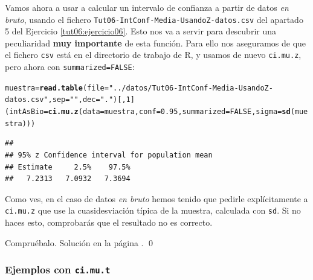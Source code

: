 \documentclass[10pt,a4paper]{article}\usepackage[]{graphicx}\usepackage[]{color}
\makeatletter
\newcommand{\hlnum}[1]{\textcolor[rgb]{0.686,0.059,0.569}{#1}}%
\newcommand{\hlstr}[1]{\textcolor[rgb]{0.192,0.494,0.8}{#1}}%
\newcommand{\hlstd}[1]{\textcolor[rgb]{0.345,0.345,0.345}{#1}}%
\newcommand{\hlkwb}[1]{\textcolor[rgb]{0.69,0.353,0.396}{#1}}%
\newcommand{\hlkwc}[1]{\textcolor[rgb]{0.333,0.667,0.333}{#1}}%
\newcommand{\hlkwd}[1]{\textcolor[rgb]{0.737,0.353,0.396}{\textbf{#1}}}%
\newenvironment{kframe}{%
 \def\at@end@of@kframe{}%
 \ifinner\ifhmode%
  \def\at@end@of@kframe{\end{minipage}}%
  \begin{minipage}{\columnwidth}%
 \fi\fi%
 \def\FrameCommand##1{\hskip\@totalleftmargin \hskip-\fboxsep
 \colorbox{shadecolor}{##1}\hskip-\fboxsep
     \hskip-\linewidth \hskip-\@totalleftmargin \hskip\columnwidth}%
 \MakeFramed {\advance\hsize-\width
   \@totalleftmargin\z@ \linewidth\hsize
   \@setminipage}}%
 {\par\unskip\endMakeFramed%
 \at@end@of@kframe}
\newenvironment{knitrout}{}{} %
\makeatother
\begin{document}
Vamos ahora a usar a calcular un intervalo de confianza a partir de datos {\em en bruto}, usando el fichero {\tt Tut06-IntConf-Media-UsandoZ-datos.csv} del apartado 5 del Ejercicio \ref{tut06:ejercicio06}. Esto nos va a servir para descubrir una peculiaridad {\bf muy importante} de esta función. Para ello nos aseguramos de que el fichero {\tt csv} está en el directorio de trabajo de R, y usamos de nuevo {\tt ci.mu.z}, pero ahora con {\tt summarized=FALSE}:
\begin{knitrout}
\color{fgcolor}\begin{kframe}
\begin{alltt}
\hlstd{muestra} \hlkwb{=} \hlkwd{read.table}\hlstd{(}\hlkwc{file}\hlstd{=}\hlstr{"../datos/Tut06-IntConf-Media-UsandoZ-datos.csv"}\hlstd{,} \hlkwc{sep}\hlstd{=}\hlstr{" "}\hlstd{,} \hlkwc{dec}\hlstd{=}\hlstr{"."}\hlstd{)[ ,}\hlnum{1}\hlstd{]}
\hlstd{(intAsBio} \hlkwb{=} \hlkwd{ci.mu.z}\hlstd{(}\hlkwc{data}\hlstd{=muestra,} \hlkwc{conf}\hlstd{=}\hlnum{0.95}\hlstd{,} \hlkwc{summarized}\hlstd{=}\hlnum{FALSE}\hlstd{,} \hlkwc{sigma} \hlstd{=} \hlkwd{sd}\hlstd{(muestra)))}
\end{alltt}
\begin{verbatim}
## 
## 95% z Confidence interval for population mean 
## Estimate     2.5%    97.5% 
##   7.2313   7.0932   7.3694
\end{verbatim}
\end{kframe}
\end{knitrout}
Como ves, en el caso de datos {\em en bruto} hemos tenido que pedirle explícitamente a {\tt ci.mu.z} que use la cuasidesviación típica de la muestra, calculada con {\tt sd}. Si no haces esto, comprobarás que el resultado no es correcto.
\begin{ejercicio}
\label{tut06:ejercicio24}
Compruébalo. Solución en la página \pageref{tut06:ejercicio24:sol}.
\qed
\end{ejercicio}

\subsubsection*{Ejemplos con {\tt ci.mu.t}}
\end{document}
